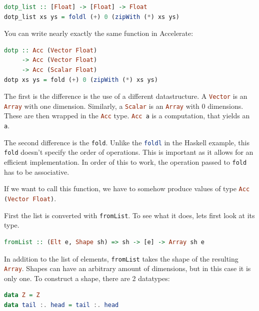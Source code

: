 \documentclass[a4paper,bibliography=totocnumbered,parskip,headsepline]{scrbook}
\begin{document}
\begin{lstlisting}[language=haskell]
dotp_list :: [Float] -> [Float] -> Float
dotp_list xs ys = foldl (+) 0 (zipWith (*) xs ys)
\end{lstlisting}

You can write nearly exactly the same function in Accelerate:

\begin{lstlisting}[language=haskell]
dotp :: Acc (Vector Float)
     -> Acc (Vector Float)
     -> Acc (Scalar Float)
dotp xs ys = fold (+) 0 (zipWith (*) xs ys)
\end{lstlisting}

The first is the difference is the use of a different datastructure.
A \lstinline[language=haskell]!Vector! is an \lstinline[language=haskell]!Array! with one dimension.
Similarly, a \lstinline[language=haskell]!Scalar! is an \lstinline[language=haskell]!Array! with 0 dimensions.
These are then wrapped in the \lstinline[language=haskell]!Acc! type.
\lstinline[language=haskell]!Acc a! is a computation, that yields an \lstinline[language=haskell]!a!.

The second difference is the \lstinline[language=haskell]!fold!.
Unlike the \lstinline[language=haskell]!foldl! in the Haskell example, this \lstinline[language=haskell]!fold! doesn't specify the order of operations.
This is important as it allows for an efficient implementation.
In order of this to work, the operation passed to \lstinline[language=haskell]!fold! has to be associative.

If we want to call this function, we have to somehow produce values of type \lstinline[language=haskell]!Acc (Vector Float)!.

First the list is converted with \lstinline[language=haskell]!fromList!.
To see what it does, lets first look at its type.

\begin{lstlisting}[language=haskell]
fromList :: (Elt e, Shape sh) => sh -> [e] -> Array sh e
\end{lstlisting}

In addition to the list of elements, \lstinline[language=haskell]!fromList! takes the shape of the resulting \lstinline[language=haskell]!Array!.
Shapes can have an arbitrary amount of dimensions, but in this case it is only one.
To construct a shape, there are 2 datatypes:

\begin{lstlisting}[language=haskell]
data Z = Z
data tail :. head = tail :. head
\end{lstlisting}
\end{document}
